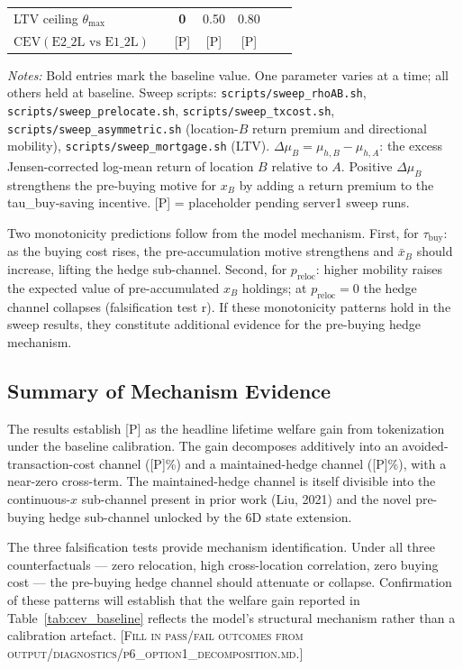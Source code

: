 \begin{table}[t]
\begin{tabular}{lcccccc}
LTV ceiling $\theta_{\max}$
    & & \textbf{0} & 0.50 & 0.80 & & \\
\quad $\text{CEV}(\text{E2\_2L vs E1\_2L})$
    & & \textsc{[P]} & \textsc{[P]} & \textsc{[P]} & & \\
\bottomrule
\end{tabular}
\vspace{4pt}
\begin{minipage}{\linewidth}
\small\textit{Notes:}
Bold entries mark the baseline value.
One parameter varies at a time; all others held at baseline.
Sweep scripts: \texttt{scripts/sweep\_rhoAB.sh},
\texttt{scripts/sweep\_prelocate.sh}, \texttt{scripts/sweep\_txcost.sh},
\texttt{scripts/sweep\_asymmetric.sh} (location-$B$ return premium and directional mobility),
\texttt{scripts/sweep\_mortgage.sh} (LTV).
$\Delta\mu_B = \mu_{h,B} - \mu_{h,A}$: the excess Jensen-corrected log-mean return of
location $B$ relative to $A$.
Positive $\Delta\mu_B$ strengthens the pre-buying motive for $x_B$ by adding a return
premium to the tau\_buy-saving incentive.
\textsc{[P]} = placeholder pending server1 sweep runs.
\end{minipage}
\end{table}

Two monotonicity predictions follow from the model mechanism.
First, for $\tau_{\text{buy}}$: as the buying cost rises, the pre-accumulation
motive strengthens and $\bar{x}_B$ should increase, lifting the hedge sub-channel.
Second, for $p_{\text{reloc}}$: higher mobility raises the expected value of
pre-accumulated $x_B$ holdings; at $p_{\text{reloc}} = 0$ the hedge channel
collapses (falsification test r).
If these monotonicity patterns hold in the sweep results, they constitute
additional evidence for the pre-buying hedge mechanism.

\subsection{Summary of Mechanism Evidence}
\label{sec:results:summary}

The results establish \textsc{[P]} as the headline lifetime welfare gain from
tokenization under the baseline calibration.
The gain decomposes additively into an avoided-transaction-cost channel
(\textsc{[P]}\%) and a maintained-hedge channel (\textsc{[P]}\%), with
a near-zero cross-term.
The maintained-hedge channel is itself divisible into the continuous-$x$
sub-channel present in prior work (Liu, 2021) and the novel pre-buying hedge
sub-channel unlocked by the 6D state extension.

The three falsification tests provide mechanism identification.
Under all three counterfactuals --- zero relocation, high cross-location
correlation, zero buying cost --- the pre-buying hedge channel should
attenuate or collapse.
Confirmation of these patterns will establish that the welfare gain reported
in Table~\ref{tab:cev_baseline} reflects the model's structural mechanism
rather than a calibration artefact.
\textsc{[Fill in pass/fail outcomes from output/diagnostics/p6\_option1\_decomposition.md.]}
